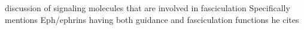 
\cite{van1998adhesion} discussion of signaling molecules that are involved in fasciculation
Specifically mentions Eph/ephrins having both guidance and fasciculation functions
he cites \cite{henkemeyer1996nuk,}